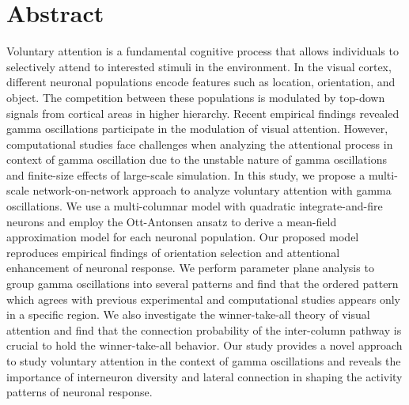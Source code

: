 \documentclass[10pt,letterpaper]{article}
\begin{document}
\section*{Abstract}
Voluntary attention is a fundamental cognitive process that allows individuals to selectively attend to interested stimuli in the environment. In the visual cortex, different neuronal populations encode features such as location, orientation, and object. The competition between these populations is modulated by top-down signals from cortical areas in higher hierarchy. Recent empirical findings revealed gamma oscillations participate in the modulation of visual attention. However, computational studies face challenges when analyzing the attentional process in context of gamma oscillation due to the unstable nature of gamma oscillations and finite-size effects of large-scale simulation.
In this study, we propose a multi-scale network-on-network approach to analyze voluntary attention with gamma oscillations. We use a multi-columnar model with quadratic integrate-and-fire neurons and employ the Ott-Antonsen ansatz to derive a mean-field approximation model for each neuronal population. Our proposed model reproduces empirical findings of orientation selection and attentional enhancement of neuronal response. We perform parameter plane analysis to group gamma oscillations into several patterns and find that the ordered pattern which agrees with previous experimental and computational studies appears only in a specific region. We also investigate the winner-take-all theory of visual attention and find that the connection probability of the inter-column pathway is crucial to hold the winner-take-all behavior. Our study provides a novel approach to study voluntary attention in the context of gamma oscillations and reveals the importance of interneuron diversity and lateral connection in shaping the activity patterns of neuronal response.

\end{document}
